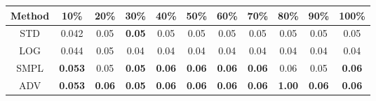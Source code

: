 \documentclass{standalone}
\begin{document}
\begin{tabular}{c|cccccccccc}
      \toprule
      Method & 10\% & 20\% & 30\% & 40\% & 50\% & 60\% & 70\% & 80\% & 90\% & 100\% \\
      \midrule
STD & 0.042 & 0.05 & \textbf{0.05} & 0.05 & 0.05 & 0.05 & 0.05 & 0.05 & 0.05 & 0.05\\
LOG & 0.044 & 0.05 & 0.04 & 0.04 & 0.04 & 0.04 & 0.04 & 0.04 & 0.04 & 0.04\\
SMPL & \textbf{0.053} & 0.05 & \textbf{0.05} & \textbf{0.06} & \textbf{0.06} & \textbf{0.06} & \textbf{0.06} & 0.06 & 0.05 & \textbf{0.06}\\
ADV & \textbf{0.053} & \textbf{0.06} & \textbf{0.05} & \textbf{0.06} & \textbf{0.06} & \textbf{0.06} & \textbf{0.06} & \textbf{1.00} & \textbf{0.06} & \textbf{0.06}\\
  \bottomrule
\end{tabular}
\end{document}
